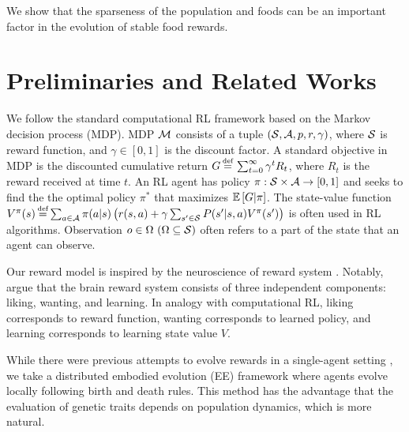 We show that the sparseness of the population and foods can be an important factor in the evolution of stable food rewards.

\section{Preliminaries and Related Works}\label{sec:related}
We follow the standard computational RL framework \citep{suttonReinforcementLearningIntroduction2018} based on the Markov decision process (MDP). MDP $\mathcal{M}{}$ consists of a tuple $(\mathcal{S}{}, \mathcal{A}{}, p, r, \gamma)$, where $\mathcal{S}{}$ is reward function, and $\gamma \in [0, 1]$ is the discount factor. A standard objective in MDP is the discounted cumulative return $G \defequal{} \sum_{t=0}^{\infty}\gamma^t R_{t}$, where $R_t$ is the reward received at time $t$. An RL agent has policy $\pi: \mathcal{S} \times \mathcal{A} \rightarrow [0, 1]$ and seeks to find the the optimal policy $\pi^{*}$ that maximizes $\mathbb{E} \left[G|\pi\right]$. The state-value function $V^\pi(s) \defequal \sum_{a \in \A} \pi(a|s) \left( r(s, a) + \gamma \sum_{s' \in \X} P(s'|s, a) V^\pi(s') \right)$ is often used in RL algorithms. Observation $o \in \Omega~(\Omega \subseteq \mathcal{S})$ often refers to a part of the state that an agent can observe.

Our reward model is inspired by the neuroscience of reward system \citep{schultzNeuronalRewardDecision2015, berridgePleasureSystemsBrain2015}. Notably, \citet{berridgeDissectingComponentsReward2009} argue that the brain reward system consists of three independent components: liking, wanting, and learning. In analogy with computational RL, liking corresponds to reward function, wanting corresponds to learned policy, and learning corresponds to learning state value $V$. %

While
there were previous attempts to evolve rewards in a single-agent setting \citep{singhWhereRewardsCome2009,niekumEvolutionRewardFunctions2011,zhengWhatCanLearned2020},
we take a distributed embodied evolution (EE) framework \citep{watsonEmbodiedEvolutionDistributing2002,bredecheEmbodiedEvolutionCollective2018}
where agents evolve locally following birth and death rules. This method has the advantage that the evaluation of genetic traits depends on population dynamics, which is more natural.

